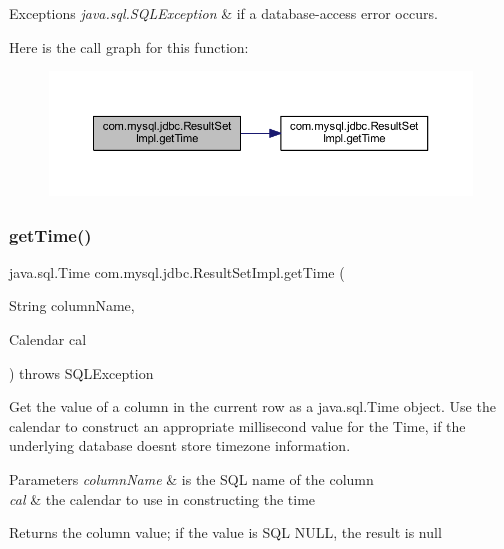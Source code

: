 \begin{DoxyExceptions}{Exceptions}
{\em java.\+sql.\+S\+Q\+L\+Exception} & if a database-\/access error occurs. \\
\hline
\end{DoxyExceptions}
Here is the call graph for this function\+:
\nopagebreak
\begin{figure}[H]
\begin{center}
\leavevmode
\includegraphics[width=350pt]{classcom_1_1mysql_1_1jdbc_1_1_result_set_impl_a1ef88fb26be60b7e950e8f34426d3a55_cgraph}
\end{center}
\end{figure}
\mbox{\label{classcom_1_1mysql_1_1jdbc_1_1_result_set_impl_a5014fd4ae2a0df1e39cb403441473e9b}} 
\subsubsection{\texorpdfstring{get\+Time()}{getTime()}\hspace{0.1cm}{\footnotesize\ttfamily [4/4]}}
{\footnotesize\ttfamily java.\+sql.\+Time com.\+mysql.\+jdbc.\+Result\+Set\+Impl.\+get\+Time (\begin{DoxyParamCaption}\item[{String}]{column\+Name,  }\item[{Calendar}]{cal }\end{DoxyParamCaption}) throws S\+Q\+L\+Exception}

Get the value of a column in the current row as a java.\+sql.\+Time object. Use the calendar to construct an appropriate millisecond value for the Time, if the underlying database doesn\textquotesingle{}t store timezone information.


\begin{DoxyParams}{Parameters}
{\em column\+Name} & is the S\+QL name of the column \\
\hline
{\em cal} & the calendar to use in constructing the time\\
\hline
\end{DoxyParams}
\begin{DoxyReturn}{Returns}
the column value; if the value is S\+QL N\+U\+LL, the result is null
\end{DoxyReturn}


